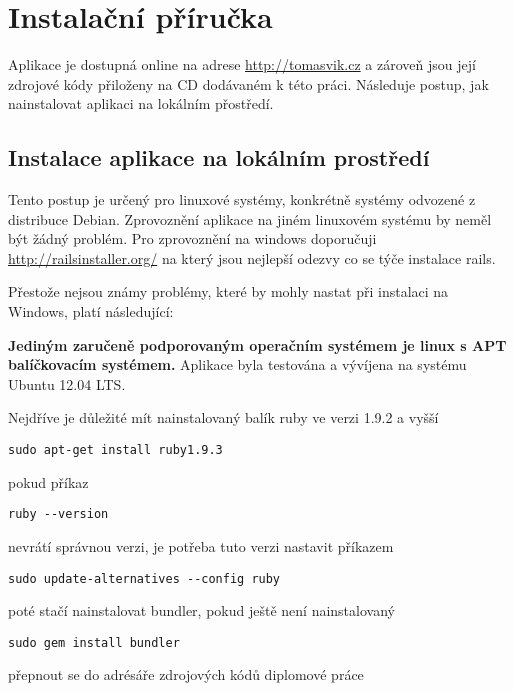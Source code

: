\chapter{Instalační příručka}
Aplikace je dostupná online na adrese \url{http://tomasvik.cz} a zároveň jsou její zdrojové kódy přiloženy na CD dodávaném k této práci. Následuje postup, jak nainstalovat aplikaci na lokálním přostředí.

\section{Instalace aplikace na lokálním prostředí}
Tento postup je určený pro linuxové systémy, konkrétně systémy odvozené z distribuce Debian. Zprovoznění aplikace na jiném linuxovém systému by neměl být žádný problém. Pro zprovoznění na windows doporučuji \url{http://railsinstaller.org/} na který jsou nejlepší odezvy co se týče instalace rails.

Přestože nejsou známy problémy, které by mohly nastat při instalaci na Windows, platí následující:

\textbf{Jediným zaručeně podporovaným operačním systémem je linux s APT balíčkovacím systémem.} Aplikace byla testována a vývíjena na systému Ubuntu 12.04 LTS.

Nejdříve je důležité mít nainstalovaný balík ruby ve verzi 1.9.2 a vyšší

\lstset{language = bash, style=custom}
\begin{lstlisting}
sudo apt-get install ruby1.9.3
\end{lstlisting}

pokud příkaz

\begin{lstlisting}
ruby --version
\end{lstlisting}

nevrátí správnou verzi, je potřeba tuto verzi nastavit příkazem

\begin{lstlisting}
sudo update-alternatives --config ruby
\end{lstlisting}

poté stačí nainstalovat bundler, pokud ještě není nainstalovaný

\begin{lstlisting}
sudo gem install bundler
\end{lstlisting}

přepnout se do adrésáře zdrojových kódů diplomové práce

